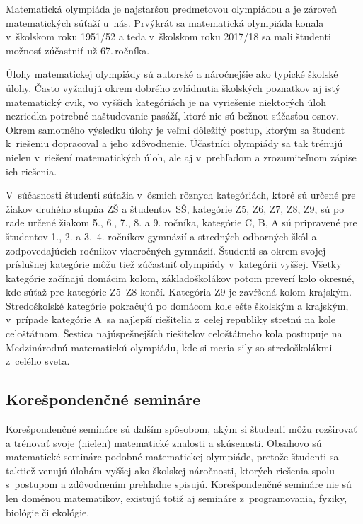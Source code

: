 Matematická olympiáda je najstaršou predmetovou olympiádou a je zároveň  matematických súťaží u~nás. Prvýkrát sa matematická olympiáda konala v~školskom roku 1951/52 a teda v~školskom roku 2017/18 sa mali študenti možnosť zúčastniť už 67.\,ročníka.

Úlohy matematickej olympiády sú autorské a náročnejšie ako typické školské úlohy. Často vyžadujú okrem dobrého zvládnutia školských poznatkov aj istý matematický cvik, vo vyšších kategóriách je na vyriešenie niektorých úloh nezriedka potrebné naštudovanie pasáží, ktoré nie sú bežnou súčasťou osnov. Okrem samotného výsledku úlohy je veľmi dôležitý postup, ktorým sa študent k~riešeniu dopracoval a jeho zdôvodnenie. Účastníci olympiády sa tak trénujú nielen v~riešení matematických úloh, ale aj v~prehľadom a zrozumiteľnom zápise ich riešenia.

V~súčasnosti študenti súťažia v~ôsmich rôznych kategóriách, ktoré sú určené pre žiakov druhého stupňa ZŠ a študentov SŠ, kategórie Z5, Z6, Z7, Z8, Z9, sú po rade určené žiakom 5., 6., 7., 8. a 9. ročníka, kategórie C, B, A sú pripravené pre študentov 1., 2. a 3.--4. ročníkov gymnázií a stredných odborných škôl a zodpovedajúcich ročníkov viacročných gymnázií. Študenti sa okrem svojej príslušnej kategórie môžu tiež zúčastniť olympiády v~kategórii vyššej. Všetky kategórie začínajú domácim kolom, základoškolákov potom preverí kolo okresné, kde súťaž pre kategórie Z5--Z8 končí. Kategória Z9 je zavŕšená kolom krajským. Stredoškolské kategórie pokračujú po domácom kole ešte školským a krajským, v~prípade kategórie A~sa najlepší riešitelia z~celej republiky stretnú na kole celoštátnom. Šestica najúspešnejších riešiteľov celoštátneho kola postupuje na Medzinárodnú matematickú olympiádu, kde si meria sily so stredoškolákmi z~celého sveta.

\subsection*{Korešpondenčné semináre}

Korešpondenčné semináre sú ďalším spôsobom, akým si študenti môžu rozširovať a trénovať svoje (nielen) matematické znalosti a skúsenosti. Obsahovo sú matematické semináre podobné matematickej olympiáde, pretože študenti sa taktiež venujú úlohám vyššej ako školskej náročnosti, ktorých riešenia spolu s~postupom a zdôvodnením prehľadne spisujú. Korešpondenčné semináre nie sú len doménou matematikov, existujú totiž aj semináre z~programovania, fyziky, biológie či ekológie.

